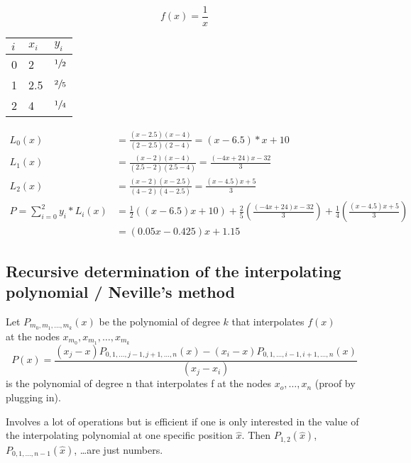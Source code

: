 \begin{example}
    \begin{equation*}
        f(x)= \frac{1}{x}
    \end{equation*}
    \begin{center}
        \begin{tabular}{l l l}
            \toprule
            $i$ & $x_i$ & $y_i$          \\
            \midrule
            0   & 2     & $\sfrac{1}{2}$ \\
            1   & 2.5   & $\sfrac{2}{5}$ \\
            2   & 4     & $\sfrac{1}{4}$ \\
            \bottomrule
        \end{tabular}
    \end{center}

    \begin{align*}
        L_0(x) &= \frac{(x-2.5)(x-4)}{(2-2.5)(2-4)}=(x-6.5)*x+10\\
        L_1(x) &= \frac{(x-2)(x-4)}{(2.5-2)(2.5-4)}=\frac{(-4x+24)x-32}{3}\\
        L_2(x) &= \frac{(x-2)(x-2.5)}{(4-2)(4-2.5)}= \frac{(x-4.5)x+5}{3}\\
        P=\sum_{i=0}^{2}y_i*L_i(x) &= \frac{1}{2}((x-6.5)x+10)+ \frac{2}{5}
        \left( \frac{(-4x+24)x-32}{3} \right)+\frac{1}{4}\left( \frac{(x-4.5)x+5}{3} \right)\\
        &=(0.05x-0.425)x+1.15
    \end{align*}
\end{example}

\subsection{Recursive determination of the interpolating polynomial / Neville's method}\label{subsec:recursive-determination-of-the-interpolating-polynomial-/-neville's-method}
Let $P_{m_0, m_1, \dots, m_k} (x)$ be the polynomial of degree $k$ that interpolates $f(x)$\\
at the nodes $x_{m_0}, x_{m_1},\ldots,x_{m_k}$
\begin{equation*}
    P(x)= \frac{(x_j-x)P_{0,1,\ldots, j-1, j+1, \ldots, n}(x)-(x_i-x)P_{0,1,\ldots, i-1, i+1, \ldots, n}(x)}{(x_j-x_i)}
\end{equation*}
is the polynomial of degree n that interpolates f at the nodes $x_o, \ldots, x_n$ (proof by plugging in).

Involves a lot of operations but is efficient if one is only interested in the value of the interpolating polynomial at one specific position $\hat{x}$.
Then $P_{1,2}(\hat{x})$, $P_{0,1,\ldots, n-1}(\hat{x})$, \ldots are just numbers.

